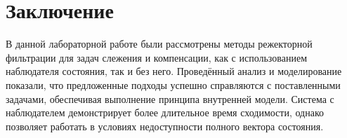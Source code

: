 \section{Заключение}

В данной лабораторной работе были рассмотрены методы режекторной фильтрации для задач слежения 
и компенсации, как с использованием наблюдателя состояния, так и без него. Проведённый анализ 
и моделирование показали, что предложенные подходы успешно справляются с поставленными задачами, 
обеспечивая выполнение принципа внутренней модели. Система с наблюдателем демонстрирует
более длительное время сходимости, однако позволяет работать в условиях недоступности
полного вектора состояния.